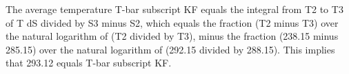 The average temperature T-bar subscript KF equals the integral from T2 to T3 of T dS divided by S3 minus S2, which equals the fraction (T2 minus T3) over the natural logarithm of (T2 divided by T3), minus the fraction (238.15 minus 285.15) over the natural logarithm of (292.15 divided by 288.15). This implies that 293.12 equals T-bar subscript KF.